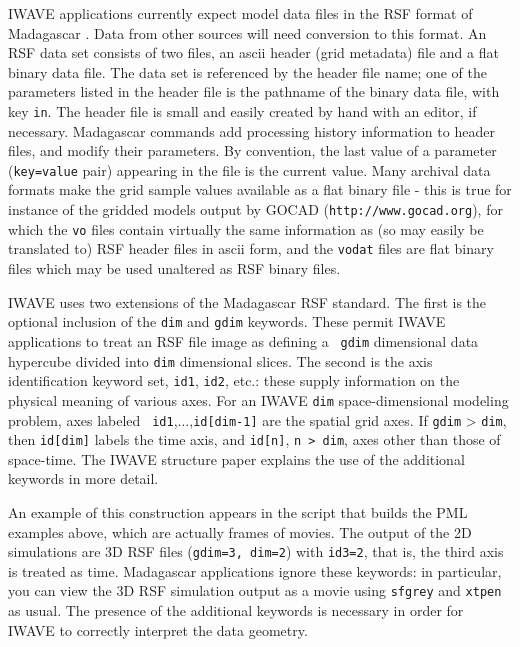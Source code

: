IWAVE applications currently expect model data files in the RSF
format of Madagascar \cite[]{Madagascar}. Data
from other sources will need conversion to this format. An RSF data
set consists of two files, an ascii header (grid metadata) file and a
flat binary data file. The data set is referenced by the header file
name; one of the parameters listed in the header file is the pathname
of the binary data file, with key {\tt in}. The header file is small
and easily created by hand with an editor, if necessary. Madagascar
commands add processing history information to header files, and
modify their parameters. By convention, the last value of a parameter
({\tt key=value} pair) appearing in the file is the current value. Many archival
data formats make the grid sample values available as a flat binary
file - this is true for instance of the gridded models output by GOCAD
({\tt http://www.gocad.org}), for which the {\tt vo} files contain virtually
the same information as (so may easily be translated to) RSF header
files in ascii form, and the {\tt vodat} files are flat binary files
which may be used unaltered as RSF binary files.

IWAVE uses two extensions of the Madagascar RSF standard. The first is
the optional inclusion of the {\tt dim} and {\tt gdim} keywords. These
permit IWAVE applications to treat an RSF file image as defining a {\tt
  gdim} dimensional data hypercube divided into {\tt dim} dimensional
slices. The second is the axis identification keyword set, {\tt id1}, {\tt id2},
etc.: these supply information on the physical meaning of various axes. For an IWAVE {\tt dim} space-dimensional modeling problem, axes labeled {\tt
  id1},...,{\tt id[dim-1]} are the spatial grid axes. If {\tt gdim} >
{\tt dim}, then {\tt id[dim]} labels the time axis, and {\tt id[n]},
{\tt n > dim}, axes other than those of space-time. The IWAVE
structure paper \cite[]{trip14:struct} explains the use of the
additional keywords in more detail.

An example of this construction appears in the script that builds the
PML examples above, which are actually frames of movies. The output of
the 2D simulations are 3D RSF files ({\tt gdim=3, dim=2}) with {\tt id3=2},
that is, the third axis is treated as time. Madagascar applications
ignore these keywords: in particular, you can view the 3D RSF simulation
output as a movie using
{\tt sfgrey} and {\tt xtpen} as usual. The presence of the additional keywords is necessary in order
for IWAVE to correctly interpret the data geometry. 

